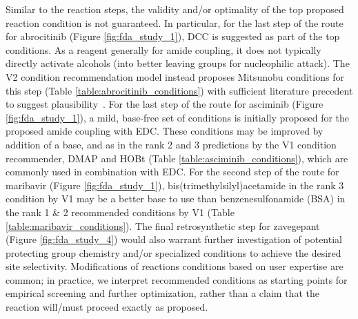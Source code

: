 \documentclass[pdflatex,sn-mathphys-num]{sn-jnl}%
\theoremstyle{thmstyleone}%
\theoremstyle{thmstyletwo}%
\theoremstyle{thmstylethree}%
\begin{document}
Similar to the reaction steps, the validity and/or optimality of the top proposed reaction condition is not guaranteed. In particular, for the last step of the route for abrocitinib (Figure \ref{fig:fda_study_1}), DCC is suggested as part of the top conditions. As a reagent generally for amide coupling, it does not typically directly activate alcohols (into better leaving groups for nucleophilic attack). The V2 condition recommendation model instead proposes Mitsunobu conditions for this step (Table \ref{table:abrocitinib_conditions}) with sufficient literature precedent to suggest plausibility~\citep{henry1989mitsunobu}. For the last step of the route for asciminib (Figure \ref{fig:fda_study_1}), a mild, base-free set of conditions is initially proposed for the proposed amide coupling with EDC. These conditions may be improved by addition of a base, and as in the rank 2 and 3 predictions by the V1 condition recommender, DMAP and HOBt (Table \ref{table:asciminib_conditions}), which are commonly used in combination with EDC. For the second step of the route for maribavir (Figure \ref{fig:fda_study_1}), bis(trimethylsilyl)acetamide in the rank 3 condition by V1 may be a better base to use than benzenesulfonamide (BSA) in the rank 1 \& 2 recommended conditions by V1 (Table \ref{table:maribavir_conditions}). The final retrosynthetic step for zavegepant (Figure \ref{fig:fda_study_4}) would also warrant further investigation of potential protecting group chemistry and/or specialized conditions to achieve the desired site selectivity. Modifications of reactions conditions based on user expertise are common; in practice, we interpret recommended conditions as starting points for empirical screening and further optimization, rather than a claim that the reaction will/must proceed exactly as proposed.
\end{document}
